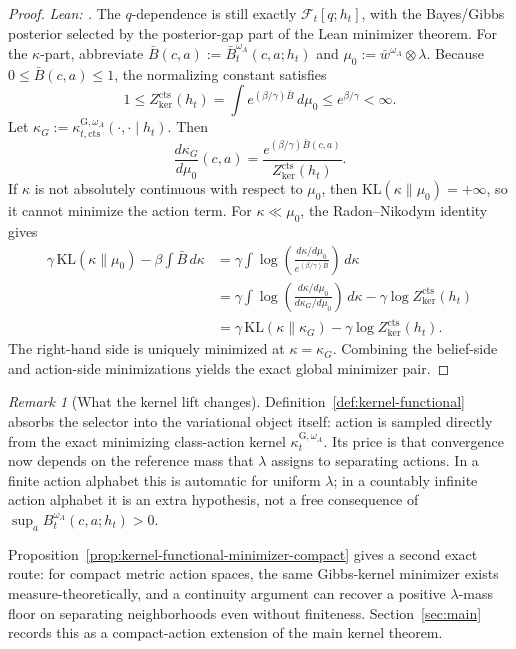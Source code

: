 \documentclass[11pt]{article}
\theoremstyle{definition}
\theoremstyle{remark}
\newtheorem{remark}[theorem]{Remark}
\theoremstyle{plain}
\theoremstyle{definition}
\newcommand{\KL}{\mathrm{KL}}
\begin{document}
\begin{proof}
\noindent\emph{Lean: .}
The $q$-dependence is still exactly $\mathcal F_t[q;h_t]$, with the Bayes/Gibbs posterior selected by the posterior-gap part of the Lean minimizer theorem. For the $\kappa$-part, abbreviate $\bar B(c,a):=\bar B_t^{\omega_A}(c,a;h_t)$ and $\mu_0:=\bar w^{\omega_A}\otimes\lambda$. Because $0\le \bar B(c,a)\le 1$, the normalizing constant satisfies
\[
1\le Z_{\mathrm{ker}}^{\mathrm{cts}}(h_t)=\int e^{(\beta/\gamma)\bar B}\,d\mu_0\le e^{\beta/\gamma}<\infty.
\]
Let $\kappa_G:=\kappa_{t,\mathrm{cts}}^{\mathrm G,\omega_A}(\cdot,\cdot\mid h_t)$. Then
\[
\frac{d\kappa_G}{d\mu_0}(c,a)=\frac{e^{(\beta/\gamma)\bar B(c,a)}}{Z_{\mathrm{ker}}^{\mathrm{cts}}(h_t)}.
\]
If $\kappa$ is not absolutely continuous with respect to $\mu_0$, then $\KL(\kappa\|\mu_0)=+\infty$, so it cannot minimize the action term. For $\kappa\ll\mu_0$, the Radon--Nikodym identity gives
\begin{align*}
\gamma\,\KL(\kappa\|\mu_0)-\beta\int \bar B\,d\kappa
&=\gamma\int \log\!\left(\frac{d\kappa/d\mu_0}{e^{(\beta/\gamma)\bar B}}\right)\,d\kappa\\
&=\gamma\int \log\!\left(\frac{d\kappa/d\mu_0}{d\kappa_G/d\mu_0}\right)\,d\kappa-\gamma\log Z_{\mathrm{ker}}^{\mathrm{cts}}(h_t)\\
&=\gamma\,\KL(\kappa\|\kappa_G)-\gamma\log Z_{\mathrm{ker}}^{\mathrm{cts}}(h_t).
\end{align*}
The right-hand side is uniquely minimized at $\kappa=\kappa_G$. Combining the belief-side and action-side minimizations yields the exact global minimizer pair.
\end{proof}

\begin{remark}[What the kernel lift changes]
\label{rem:kernel-functional-scope}
Definition~\ref{def:kernel-functional} absorbs the selector into the variational object itself: action is sampled directly from the exact minimizing class-action kernel $\kappa_t^{\mathrm G,\omega_A}$. Its price is that convergence now depends on the reference mass that $\lambda$ assigns to separating actions. In a finite action alphabet this is automatic for uniform $\lambda$; in a countably infinite action alphabet it is an extra hypothesis, not a free consequence of $\sup_a B_t^{\omega_A}(c,a;h_t)>0$.
\par
Proposition~\ref{prop:kernel-functional-minimizer-compact} gives a second exact route: for compact metric action spaces, the same Gibbs-kernel minimizer exists measure-theoretically, and a continuity argument can recover a positive $\lambda$-mass floor on separating neighborhoods even without finiteness. Section~\ref{sec:main} records this as a compact-action extension of the main kernel theorem.
\end{remark}
\end{document}
